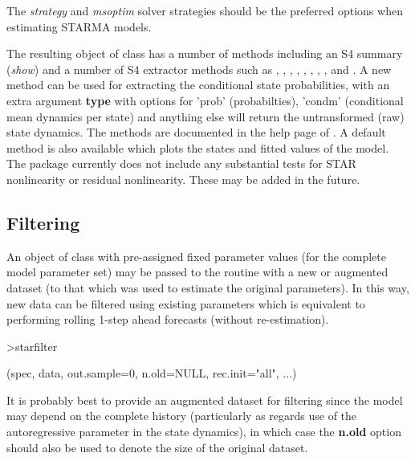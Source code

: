 The \emph{strategy} and \emph{msoptim} solver strategies should be the preferred
options when estimating STARMA models.

The resulting object of class  has a number of methods including
an S4 summary (\emph{show}) and a number of S4 extractor methods such as
, , , ,
, , , , 
and .
A new method  can be used for extracting the conditional state
probabilities, with an extra argument \textbf{type} with options for 'prob' 
(probabilties), 'condm' (conditional mean dynamics per state) and anything else 
will return the untransformed (raw) state dynamics. The methods are documented
in the help page of . A default  method is also
available which plots the states and fitted values of the model.
The package currently does not include any substantial tests for STAR
nonlinearity or residual nonlinearity. These may be added in the future.

\subsection{Filtering}
An object of class  with pre-assigned fixed parameter values
(for the complete model parameter set) may be passed to the 
routine with a new or augmented dataset (to that which was used to estimate the
original parameters). In this way, new data can be filtered using existing
parameters which is equivalent to performing rolling 1-step ahead forecasts
(without re-estimation).
\begin{Schunk}
\begin{Sinput}
>starfilter
\end{Sinput}
\begin{Soutput}
(spec, data, out.sample=0, n.old=NULL, rec.init="all", ...) 
\end{Soutput}
\end{Schunk}
It is probably best to provide an augmented dataset for filtering since the
model may depend on the complete history (particularly as regards use of the
autoregressive parameter in the state dynamics), in which case the
\textbf{n.old} option should also be used to denote the size of the original
dataset.

